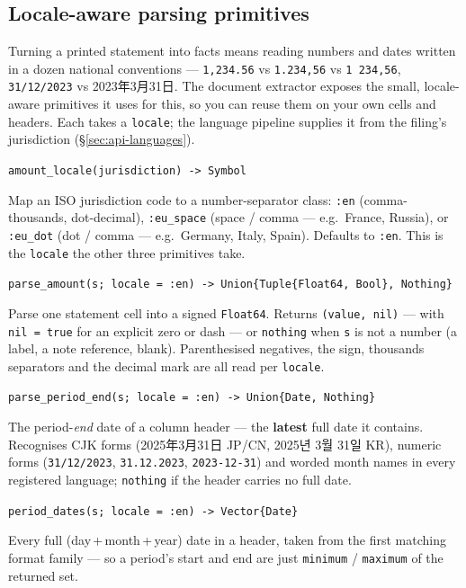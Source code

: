 \documentclass[11pt,a4paper]{report}
\newcommand{\krcjk}[2]{{\cjkKRfont #1}}
\newcommand{\jpcjk}[2]{{\cjkJPfont #1}}
\newcommand{\sig}[1]{\medskip\noindent\texttt{#1}\par\medskip}
\begin{document}
\subsection{Locale-aware parsing primitives}
\label{sec:api-parsing-primitives}

Turning a printed statement into facts means reading numbers and dates written in a dozen national conventions
--- \texttt{1,234.56} vs \texttt{1.234,56} vs \texttt{1\,234,56}, \texttt{31/12/2023} vs \jpcjk{2023年3月31日}{}.
The document extractor exposes the small, locale-aware primitives it uses for this, so you can reuse them on
your own cells and headers. Each takes a \texttt{locale}; the language pipeline supplies it from the filing's
jurisdiction (\S\ref{sec:api-languages}).

\sig{amount\_locale(jurisdiction) -> Symbol}

\noindent Map an ISO jurisdiction code to a number-separator class: \texttt{:en} (comma-thousands,
dot-decimal), \texttt{:eu\_space} (space / comma --- e.g.\ France, Russia), or \texttt{:eu\_dot} (dot / comma
--- e.g.\ Germany, Italy, Spain). Defaults to \texttt{:en}. This is the \texttt{locale} the other three
primitives take.

\sig{parse\_amount(s; locale = :en) -> Union\{Tuple\{Float64, Bool\}, Nothing\}}

\noindent Parse one statement cell into a signed \texttt{Float64}. Returns \texttt{(value, nil)} --- with
\texttt{nil\,=\,true} for an explicit zero or dash --- or \texttt{nothing} when \texttt{s} is not a number (a
label, a note reference, blank). Parenthesised negatives, the sign, thousands separators and the decimal mark
are all read per \texttt{locale}.

\sig{parse\_period\_end(s; locale = :en) -> Union\{Date, Nothing\}}

\noindent The period-\emph{end} date of a column header --- the \textbf{latest} full date it contains.
Recognises CJK forms (\jpcjk{2025年3月31日}{} JP/CN, \krcjk{2025년 3월 31일}{} KR), numeric forms
(\texttt{31/12/2023}, \texttt{31.12.2023}, \texttt{2023-12-31}) and worded month names in every registered
language; \texttt{nothing} if the header carries no full date.

\sig{period\_dates(s; locale = :en) -> Vector\{Date\}}

\noindent Every full (day\,+\,month\,+\,year) date in a header, taken from the first matching format family ---
so a period's start and end are just \texttt{minimum} / \texttt{maximum} of the returned set.
\end{document}
